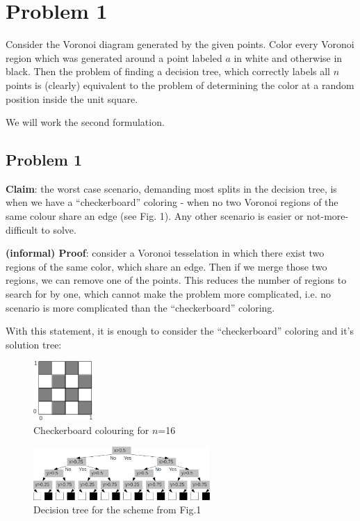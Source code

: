 \section*{Problem 1}

Consider the Voronoi diagram generated by the given points. Color every Voronoi region which was generated around a point labeled $a$ in white and otherwise in black. Then the problem of finding a decision tree, which correctly labels all $n$ points is (clearly) equivalent to the problem of determining the color at a random position inside the unit square.

We will work the second formulation.

\subsection*{Problem 1}

\textbf{Claim}: the worst case scenario, demanding most splits in the decision tree, is when we have a ``checkerboard'' coloring - when no two Voronoi regions of the same colour share an edge (see Fig. 1). Any other scenario is easier or not-more-difficult to solve.

\textbf{(informal) Proof}: consider a Voronoi tesselation in which there exist two regions of the same color, which share an edge. Then if we merge those two regions, we can remove one of the points. This reduces the number of regions to search for by one, which cannot make the problem more complicated, i.e. no scenario is more complicated than the ``checkerboard'' coloring.

With this statement, it is enough to consider the ``checkerboard'' coloring and it's solution tree:

\begin{figure}[!h]
  \begin{center}
    \includegraphics[width=0.2\textwidth]{plots/1_1.png}
    \caption{Checkerboard colouring for $n$=16}
  \end{center}
\end{figure}


\begin{figure}[!ht]
  \begin{center}
    \includegraphics[width=0.60\textwidth]{plots/1_2.png}
    \caption{Decision tree for the scheme from Fig.1}
  \end{center}
\end{figure}


